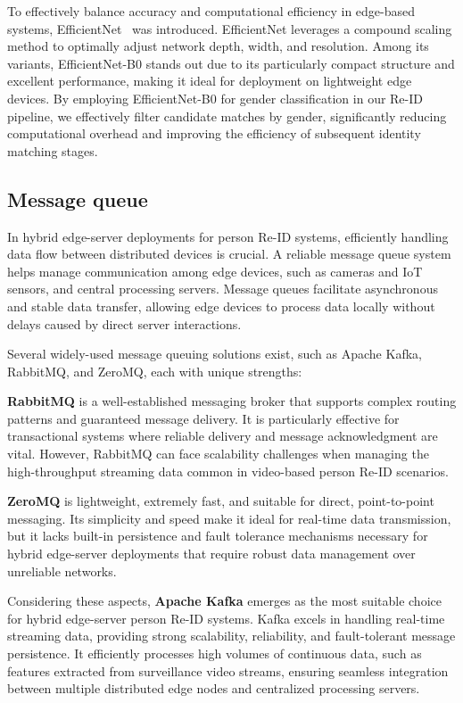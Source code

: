 \documentclass[../main.tex]{subfiles}
\begin{document}
To effectively balance accuracy and computational efficiency in edge-based systems, EfficientNet~\cite{efficientnet} was introduced. EfficientNet leverages a compound scaling method to optimally adjust network depth, width, and resolution. Among its variants, EfficientNet-B0 stands out due to its particularly compact structure and excellent performance, making it ideal for deployment on lightweight edge devices. By employing EfficientNet-B0 for gender classification in our Re-ID pipeline, we effectively filter candidate matches by gender, significantly reducing computational overhead and improving the efficiency of subsequent identity matching stages.

\subsection{Message queue}
\label{sec:message_queue}

In hybrid edge-server deployments for person Re-ID systems, efficiently handling data flow between distributed devices is crucial. A reliable message queue system helps manage communication among edge devices, such as cameras and IoT sensors, and central processing servers. Message queues facilitate asynchronous and stable data transfer, allowing edge devices to process data locally without delays caused by direct server interactions.

Several widely-used message queuing solutions exist, such as Apache Kafka, RabbitMQ, and ZeroMQ, each with unique strengths:

\textbf{RabbitMQ} \cite{rabbitmq_intro} is a well-established messaging broker that supports complex routing patterns and guaranteed message delivery. It is particularly effective for transactional systems where reliable delivery and message acknowledgment are vital. However, RabbitMQ can face scalability challenges when managing the high-throughput streaming data common in video-based person Re-ID scenarios.

\textbf{ZeroMQ} \cite{zeromq_intro} is lightweight, extremely fast, and suitable for direct, point-to-point messaging. Its simplicity and speed make it ideal for real-time data transmission, but it lacks built-in persistence and fault tolerance mechanisms necessary for hybrid edge-server deployments that require robust data management over unreliable networks.

Considering these aspects, \textbf{Apache Kafka} \cite{kafka_intro} emerges as the most suitable choice for hybrid edge-server person Re-ID systems. Kafka excels in handling real-time streaming data, providing strong scalability, reliability, and fault-tolerant message persistence. It efficiently processes high volumes of continuous data, such as features extracted from surveillance video streams, ensuring seamless integration between multiple distributed edge nodes and centralized processing servers.
\end{document}
